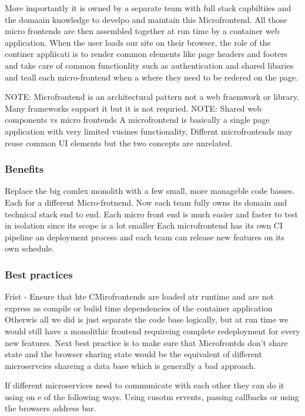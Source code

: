 \documentclass[a4paper, 11pt]{book}
\begin{document}
    More importantly it is owned by a separate team with full stack capbiltiies and the domaain knowledge to develpo and maintain this Microfrontend.
    All those micro frontends are then assembled together at run time by a container web application.
    When the user loads our site on their browser, the role of the continer appliicati is to render common elements like page headers and footers and take care of common functionlity such as authentication and shared libaries and teall each micro-frontend when a where they need to be redered on the page.

    NOTE: Microfrontend is an architectural pattern not a web fraemwork or library. Many frameworks support it but it is not requried.
    NOTE: Shared web components vs micro frontends
    A microfrontend is basically a single page application with very limited vusines functionality,
    Differnt microfrontends may reuse common UI elements but the two concepts are unrelated.

    \subsubsection{Benefits}
    Replace the big comlex monolith with a few small, more manageble code basses. Each for a different Micro-frotnend.
    Now each team fully owns its domain and technical stack end to end.
    Each micro front end is much easier and faster to test in isolation since its scope is a lot smaller
    Each microfrontend has its own CI pipeline an deployment process and each team can release new features on its own schedule.

    \subsubsection{Best practices}
    Frist - Ensure that hte CMirofrontends are loaded atr runtime and are not express as compile or bulid time dependencies of the container application
    Otherwis all we did is just separate the code base logically, but at run time we would still have a monolithic frontend requireing complete redeployment for every new features.
    Next best practice is to make sure that Microfrontds don't share state and the browser sharing state would be the equivalent of different microservcies shareing a data base which is generally a bad approach.

    If different microservices need to communicate with each other they can do it using on e of the following ways. Using cusotm ervents, passing callbacks or using the browsers address bar.
\end{document}

